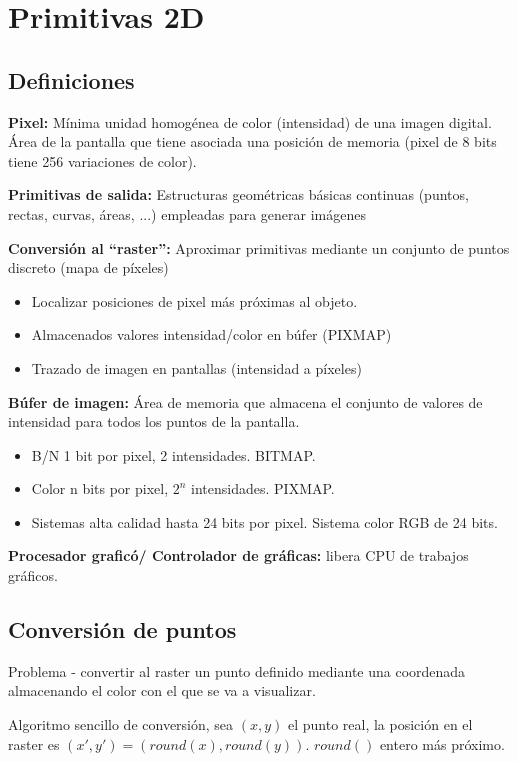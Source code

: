 \chapter{Primitivas 2D}
\section{Definiciones}
\textbf{Pixel:} Mínima unidad homogénea de color (intensidad) de una imagen digital. Área de la pantalla que tiene asociada una posición de memoria (pixel de 8 bits tiene 256 variaciones de color).

\textbf{Primitivas de salida:} Estructuras geométricas básicas continuas (puntos, rectas, curvas, áreas, ...) empleadas para generar imágenes

\textbf{Conversión al \enquote{raster}:} Aproximar primitivas mediante un conjunto de puntos discreto (mapa de píxeles)
\begin{itemize}
	\item Localizar posiciones de pixel más próximas al objeto.
	\item Almacenados valores intensidad/color en búfer (PIXMAP)
	\item Trazado de imagen en pantallas (intensidad a píxeles)
\end{itemize}

\textbf{Búfer de imagen:} Área de memoria que almacena el conjunto de valores de intensidad para todos los puntos de la pantalla.
\begin{itemize}
	\item B/N 1 bit por pixel, 2 intensidades. BITMAP.
	\item Color n bits por pixel, $2^n$ intensidades. PIXMAP.
	\item Sistemas alta calidad hasta 24 bits por pixel. Sistema color RGB de 24 bits.
\end{itemize}

\textbf{Procesador graficó/ Controlador de gráficas:}  libera CPU de trabajos gráficos.

\section{Conversión de puntos}
Problema - convertir al raster un punto definido mediante una coordenada almacenando el color con el que se va a visualizar.

Algoritmo sencillo de conversión, sea $(x, y)$ el punto real, la posición en el raster es $(x', y')=(round(x), round(y))$. $round()$ entero más próximo.

